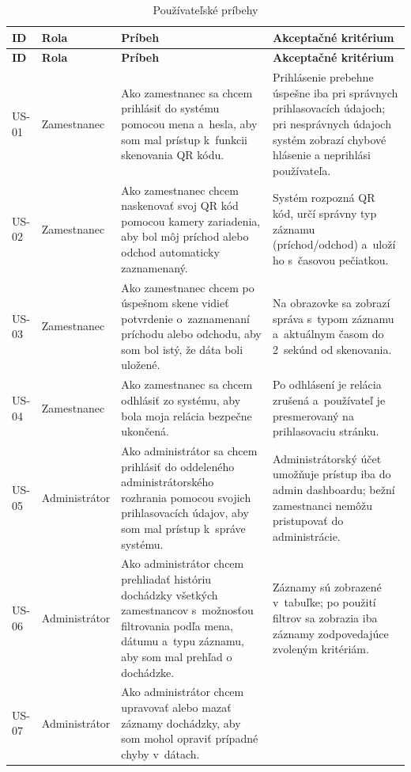 \renewcommand{\arraystretch}{1.12}
\setlength{\tabcolsep}{3pt}
\footnotesize
\begin{longtable}{|p{1.2cm}|p{2.6cm}|p{5.4cm}|p{5.4cm}|}
\caption{Používateľské príbehy}\label{t:user-stories}\\
\hline
\textbf{ID} & \textbf{Rola} & \textbf{Príbeh} & \textbf{Akceptačné kritérium} \\
\hline
\endfirsthead
\hline
\textbf{ID} & \textbf{Rola} & \textbf{Príbeh} & \textbf{Akceptačné kritérium} \\
\hline
\endhead
US-01 & Zamestnanec &
Ako zamestnanec sa chcem prihlásiť do systému pomocou mena a~hesla, aby som mal
prístup k~funkcii skenovania QR kódu. &
Prihlásenie prebehne úspešne iba pri správnych prihlasovacích údajoch; pri nesprávnych
údajoch systém zobrazí chybové hlásenie a neprihlási používateľa. \\
\hline
US-02 & Zamestnanec &
Ako zamestnanec chcem naskenovať svoj QR kód pomocou kamery zariadenia, aby bol
môj príchod alebo odchod automaticky zaznamenaný. &
Systém rozpozná QR kód, určí správny typ záznamu (príchod/odchod) a~uloží ho
s~časovou pečiatkou. \\
\hline
US-03 & Zamestnanec &
Ako zamestnanec chcem po úspešnom skene vidieť potvrdenie o~zaznamenaní príchodu
alebo odchodu, aby som bol istý, že dáta boli uložené. &
Na obrazovke sa zobrazí správa s~typom záznamu a~aktuálnym časom do 2~sekúnd
od skenovania. \\
\hline
US-04 & Zamestnanec &
Ako zamestnanec sa chcem odhlásiť zo systému, aby bola moja relácia bezpečne
ukončená. &
Po odhlásení je relácia zrušená a~používateľ je presmerovaný na prihlasovaciu
stránku. \\
\hline
US-05 & Administrátor &
Ako administrátor sa chcem prihlásiť do oddeleného administrátorského rozhrania
pomocou svojich prihlasovacích údajov, aby som mal prístup k~správe systému. &
Administrátorský účet umožňuje prístup iba do admin dashboardu; bežní zamestnanci
nemôžu pristupovať do administrácie. \\
\hline
US-06 & Administrátor &
Ako administrátor chcem prehliadať históriu dochádzky všetkých zamestnancov
s~možnosťou filtrovania podľa mena, dátumu a~typu záznamu, aby som mal prehľad
o dochádzke. &
Záznamy sú zobrazené v~tabuľke; po použití filtrov sa zobrazia iba záznamy
zodpovedajúce zvoleným kritériám. \\
\hline
US-07 & Administrátor &
Ako administrátor chcem upravovať alebo mazať záznamy dochádzky, aby som mohol
opraviť prípadné chyby v~dátach. &

\end{longtable}
